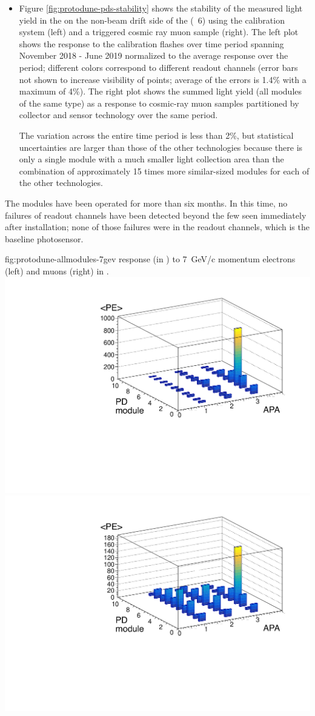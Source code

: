 \begin{itemize}
    \item Figure \ref{fig:protodune-pds-stability} shows the stability of the measured light yield in the  on the non-beam drift side of the  (~6) using the calibration system (left) and a triggered cosmic ray muon sample (right). The left plot shows the response to the calibration flashes over time period spanning November 2018 - June 2019 normalized to the average response over the period; different colors correspond to different readout channels (error bars not shown to increase visibility of points; average of the errors is 1.4\% with a maximum of 4\%). The right plot shows the summed  light yield (all modules of the same type) as a response to cosmic-ray muon samples partitioned by collector and sensor technology over the same period. 
    
  
    The  variation across the entire time period is less than 2\%, but statistical uncertainties are larger than those of the other technologies because there is only a single  module with a much smaller light collection area than the combination of approximately 15 times more similar-sized modules for each of the other technologies. 
\end{itemize}

The   modules have been operated for more than six months.  In this time, no failures of  readout channels have been detected beyond the few seen immediately after installation; none of those failures were in the  readout channels, which is the baseline photosensor. 

\begin{dunefigure}{fig:protodune-allmodules-7gev}
{ response (in \phel) to \SI{7}{GeV/c} momentum electrons (left) and muons (right) in .}
\includegraphics[angle=0,width=0.48\columnwidth]{graphics/pds-electrons-pd-modules.pdf}
\includegraphics[angle=0,width=0.48\columnwidth]{graphics/pds-muons-pd-modules.pdf}
\end{dunefigure}

